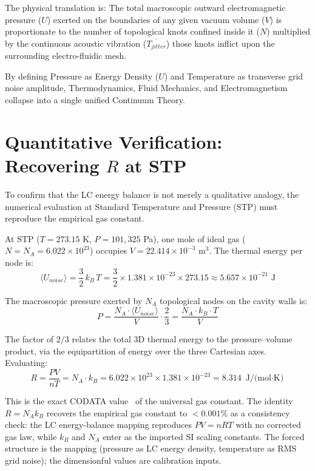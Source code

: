 The physical translation is: The total macroscopic outward electromagnetic pressure ($U$) exerted on the boundaries of any given vacuum volume ($V$) is proportionate to the number of topological knots confined inside it ($N$) multiplied by the continuous acoustic vibration ($\overline{T_{jitter}}$) those knots inflict upon the surrounding electro-fluidic mesh.

By defining Pressure as Energy Density ($U$) and Temperature as transverse grid noise amplitude, Thermodynamics, Fluid Mechanics, and Electromagnetism collapse into a single unified Continuum Theory.

\section{Quantitative Verification: Recovering $R$ at STP}

To confirm that the LC energy balance is not merely a qualitative analogy, the numerical evaluation at Standard Temperature and Pressure (STP) must reproduce the empirical gas constant.

At STP ($T = 273.15$ K, $P = 101{,}325$ Pa), one mole of ideal gas ($N = N_A = 6.022 \times 10^{23}$) occupies $V = 22.414 \times 10^{-3}$ m$^3$. The thermal energy per node is:
\begin{equation}
    \langle U_{noise} \rangle = \frac{3}{2}\, k_B\, T = \frac{3}{2} \times 1.381 \times 10^{-23} \times 273.15 \approx 5.657 \times 10^{-21} \text{ J}
\end{equation}

The macroscopic pressure exerted by $N_A$ topological nodes on the cavity walls is:
\begin{equation}
    P = \frac{N_A \cdot \langle U_{noise} \rangle}{V} \cdot \frac{2}{3} = \frac{N_A \cdot k_B \cdot T}{V}
\end{equation}

The factor of $2/3$ relates the total 3D thermal energy to the pressure--volume product, via the equipartition of energy over the three Cartesian axes. Evaluating:
\begin{equation}
    R = \frac{PV}{nT} = N_A \cdot k_B = 6.022 \times 10^{23} \times 1.381 \times 10^{-23} = 8.314 \text{ J/(mol$\cdot$K)}
\end{equation}

This is the exact CODATA value~\cite{codata2018} of the universal gas constant. The identity $R = N_A k_B$ recovers the empirical gas constant to $<0.001\%$ as a consistency check: the LC energy-balance mapping reproduces $PV = nRT$ with no corrected gas law, while $k_B$ and $N_A$ enter as the imported SI scaling constants. The forced structure is the mapping (pressure as LC energy density, temperature as RMS grid noise); the dimensionful values are calibration inputs.

